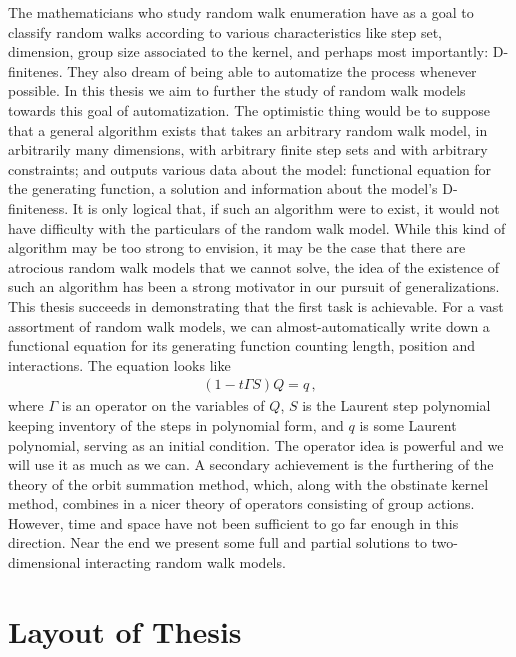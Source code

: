 The mathematicians who study random walk enumeration have as a goal to classify random walks according to various characteristics like step set, dimension, group size associated to the kernel, and perhaps most importantly: D-finitenes. They also dream of being able to automatize the process whenever possible. In this thesis we aim to further the study of random walk models towards this goal of automatization. The optimistic thing would be to suppose that a general algorithm exists that takes an arbitrary random walk model, in arbitrarily many dimensions, with arbitrary finite step sets and with arbitrary constraints; and outputs various data about the model: functional equation for the generating function, a solution and information about the model's D-finiteness. It is only logical that, if such an algorithm were to exist, it would not have difficulty with the particulars of the random walk model. While this kind of algorithm may be too strong to envision, it may be the case that there are atrocious random walk models that we cannot solve, the idea of the existence of such an algorithm has been a strong motivator in our pursuit of generalizations. This thesis succeeds in demonstrating that the first task is achievable. For a vast assortment of random walk models, we can almost-automatically write down a functional equation for its generating function counting length, position and interactions. The equation looks like
\begin{align}
	(1- t\Gamma S) Q = q\,,
\end{align}
where $\Gamma$ is an operator on the variables of $Q$, $S$ is the Laurent step polynomial keeping inventory of the steps in polynomial form, and $q$ is some Laurent polynomial, serving as an initial condition. The operator idea is powerful and we will use it as much as we can. A secondary achievement is the furthering of the theory of the orbit summation method, which, along with the obstinate kernel method, combines in a nicer theory of operators consisting of group actions. However, time and space have not been sufficient to go far enough in this direction. Near the end we present some full and partial solutions to two-dimensional interacting random walk models. 

\section{Layout of Thesis}


